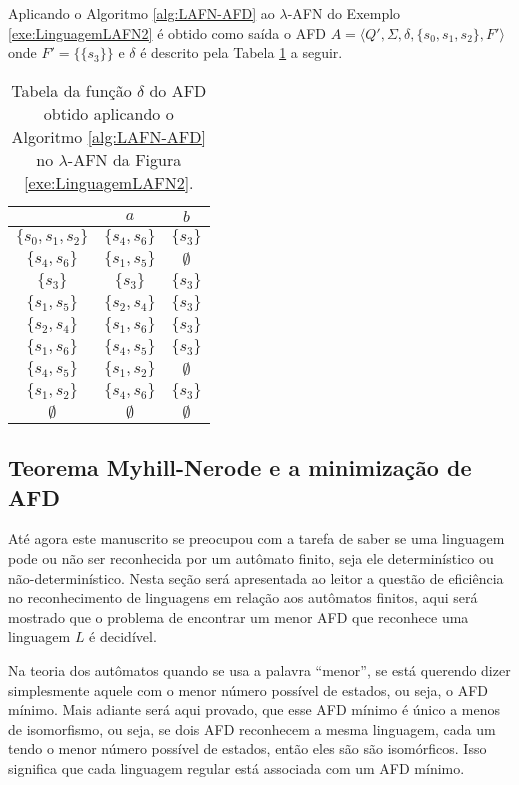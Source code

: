 \begin{exem}
	Aplicando o Algoritmo \ref{alg:LAFN-AFD} ao $\lambda$-AFN do Exemplo \ref{exe:LinguagemLAFN2} é obtido como saída o AFD $A = \langle Q', \Sigma, \delta, \{s_0, s_1, s_2\}, F' \rangle$ onde $F' = \{\{s_3\}\}$ e $\delta$ é descrito pela Tabela \ref{tab:DeltaAFD} a seguir. 
	
	\begin{table}[h]
		\centering
		\begin{tabular}{c|cc}
			\backslashbox{$Q'$}{$\Sigma$}	& $a$ & $b$\\ \hline
			$\{s_0, s_1, s_2\}$  & $\{s_4, s_6\}$ & $\{s_3\}$\\
			$\{s_4, s_6\}$  & $\{s_1, s_5\}$ & $\emptyset$\\
			$\{s_3\}$ & $\{s_3\}$ & $\{s_3\}$\\
			$\{s_1, s_5\}$ & $\{s_2, s_4\}$ & $\{s_3\}$\\
			$\{s_2, s_4\}$ & $\{s_1, s_6\}$ & $\{s_3\}$\\
			$\{s_1, s_6\}$ & $\{s_4, s_5\}$ & $\{s_3\}$\\
			$\{s_4, s_5\}$ & $\{s_1, s_2\}$ & $\emptyset$\\
			$\{s_1, s_2\}$ & $\{s_4, s_6\}$ & $\{s_3\}$\\ 
			$\emptyset$ & $\emptyset$ & $\emptyset$
		\end{tabular}
		\caption{Tabela da função $\delta$ do AFD obtido aplicando o  Algoritmo \ref{alg:LAFN-AFD} no $\lambda$-AFN da Figura \ref{exe:LinguagemLAFN2}.}
		\label{tab:DeltaAFD}
	\end{table}
\end{exem}

\subsection{Teorema Myhill-Nerode e a  minimização de AFD}

Até agora este manuscrito se preocupou com a tarefa de saber se uma linguagem pode ou não ser reconhecida por um autômato finito,  seja ele determinístico ou não-determinístico. Nesta seção será apresentada ao leitor a questão de eficiência no reconhecimento de linguagens em relação aos autômatos finitos, aqui será mostrado que o problema de encontrar um menor AFD que reconhece uma linguagem $L$ é decidível. 

Na teoria dos autômatos quando se usa a palavra ``menor'', se está querendo dizer simplesmente aquele com o menor número possível de estados, ou seja, o AFD mínimo.  Mais adiante será aqui provado, que esse AFD mínimo é único a menos de isomorfismo, ou seja, se dois AFD reconhecem a mesma linguagem, cada um tendo o menor número possível de estados, então eles são são isomórficos. Isso significa que cada linguagem regular está associada com um AFD mínimo. 

